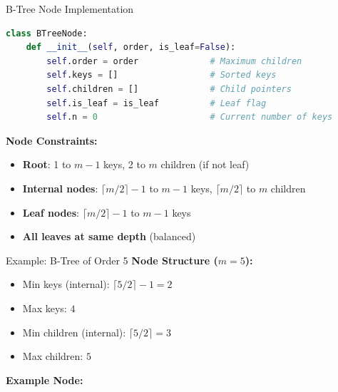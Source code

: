 \documentclass[aspectratio=169]{beamer}
\begin{document}
\begin{frame}[fragile]{B-Tree Node Implementation}
\begin{lstlisting}[language=Python, basicstyle=\ttfamily\tiny]
class BTreeNode:
    def __init__(self, order, is_leaf=False):
        self.order = order              # Maximum children
        self.keys = []                  # Sorted keys
        self.children = []              # Child pointers
        self.is_leaf = is_leaf          # Leaf flag
        self.n = 0                      # Current number of keys
\end{lstlisting}

\vspace{0.3cm}
\textbf{Node Constraints:}
\begin{itemize}
  \item \textbf{Root}: 1 to $m-1$ keys, 2 to $m$ children (if not leaf)
  \item \textbf{Internal nodes}: $\lceil m/2 \rceil - 1$ to $m-1$ keys, $\lceil m/2 \rceil$ to $m$ children
  \item \textbf{Leaf nodes}: $\lceil m/2 \rceil - 1$ to $m-1$ keys
  \item \textbf{All leaves at same depth} (balanced)
\end{itemize}
\end{frame}

\begin{frame}{Example: B-Tree of Order 5}
  \textbf{Node Structure ($m=5$):}
  \begin{itemize}
    \item Min keys (internal): $\lceil 5/2 \rceil - 1 = 2$
    \item Max keys: $4$
    \item Min children (internal): $\lceil 5/2 \rceil = 3$
    \item Max children: $5$
  \end{itemize}

  \vspace{0.3cm}
  \textbf{Example Node:}
  \begin{center}
  \end{center}
\end{frame}
\end{document}
